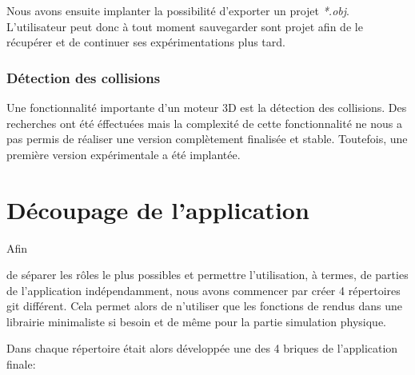 \documentclass[11pt]{report}
\begin{document}
Nous avons ensuite implanter la possibilité d'exporter un projet \textit{*.obj}. L'utilisateur peut donc à tout moment sauvegarder sont projet afin de le récupérer et de continuer ses expérimentations plus tard.


\subsection{Détection des collisions}
Une fonctionnalité importante d'un moteur 3D est la détection des collisions. Des recherches ont été éffectuées mais la complexité de cette fonctionnalité ne nous a pas permis de réaliser une version complètement finalisée et stable. Toutefois, une première version expérimentale a été implantée.



\chapter{Découpage de l'application}

\hypertarget{découpage}{Afin} de séparer les rôles le plus possibles et permettre l'utilisation, à termes, de parties de l'application
indépendamment, nous avons commencer par créer 4 répertoires git différent. Cela permet alors de n'utiliser que
les fonctions de rendus dans une librairie minimaliste si besoin et de même pour la partie simulation physique.\newline

Dans chaque répertoire était alors développée une des 4 briques de l'application finale:\newline
\end{document}
